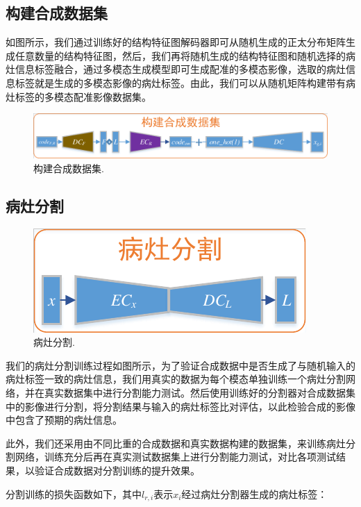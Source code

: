 \documentclass[letterpaper]{article} %
\begin{document}
\subsection{构建合成数据集}
如图所示，我们通过训练好的结构特征图解码器即可从随机生成的正太分布矩阵生成任意数量的结构特征图，然后，我们再将随机生成的结构特征图和随机选择的病灶信息标签融合，通过多模态生成模型即可生成配准的多模态影像，选取的病灶信息标签就是生成的多模态影像的病灶标签。由此，我们可以从随机矩阵构建带有病灶标签的多模态配准影像数据集。
\begin{figure}
	\centering
	\includegraphics[width=0.98\linewidth]{figures/make_data}
	\caption{构建合成数据集.}
	\label{make_data}
\end{figure}

\subsection{病灶分割}
\begin{figure}
	\centering
	\includegraphics[width=0.98\linewidth]{figures/segmentation}
	\caption{病灶分割.}
	\label{segmentation}
\end{figure}
我们的病灶分割训练过程如图所示，为了验证合成数据中是否生成了与随机输入的病灶标签一致的病灶信息，我们用真实的数据为每个模态单独训练一个病灶分割网络，并在真实数据集中进行分割能力测试。然后使用训练好的分割器对合成数据集中的影像进行分割，将分割结果与输入的病灶标签比对评估，以此检验合成的影像中包含了预期的病灶信息。

此外，我们还采用由不同比重的合成数据和真实数据构建的数据集，来训练病灶分割网络，训练充分后再在真实测试数据集上进行分割能力测试，对比各项测试结果，以验证合成数据对分割训练的提升效果。

分割训练的损失函数如下，其中$l_{r,i}$表示$x_i$经过病灶分割器生成的病灶标签：
\end{document}
